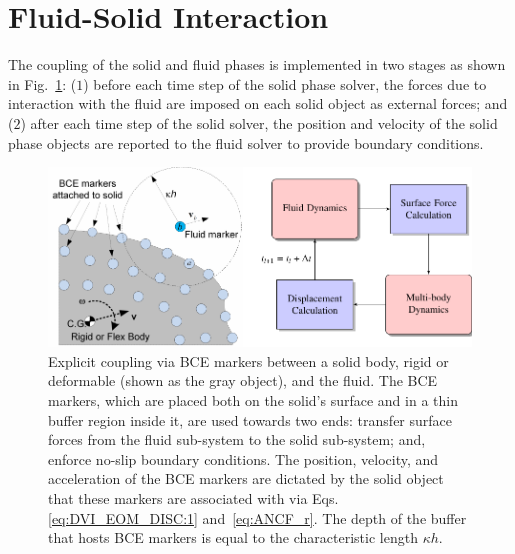 \section{Fluid-Solid Interaction}\label{sec:FSI}
The coupling of the solid and fluid phases is implemented in two stages as shown in Fig.~\ref{fig:fsi_FD}: ($1$) before each time step of the solid phase solver, the forces due to interaction with the fluid are imposed on each solid object as external forces; and ($2$) after each time step of the solid solver, the position and velocity of the solid phase objects are reported to the fluid solver to provide boundary conditions. 
\begin{figure}[H]
	\begin{center}
		\includegraphics[width=1.\textwidth]{images/FSI.pdf}
	\end{center}
	\caption{Explicit coupling via BCE markers between a solid body, rigid or deformable (shown as the gray object), and the fluid. The BCE markers, which are placed both on the solid's surface and in a thin buffer region inside it, are used towards two ends: transfer surface forces from the fluid sub-system to the solid sub-system; and, enforce no-slip boundary conditions. The position, velocity, and acceleration of the BCE markers are dictated by the solid object that these markers are associated with via Eqs.\ref{eq:DVI_EOM_DISC:1} and~\ref{eq:ANCF_r}. The depth of the buffer that hosts BCE markers is equal to the characteristic length $\kappa h$.}
	\label{fig:fsi_FD}
\end{figure}

